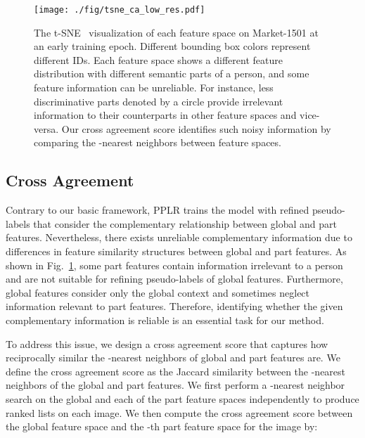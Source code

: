 \documentclass[10pt,twocolumn,letterpaper]{article}
\begin{document}
    \begin{figure}[t]
        \centering
        \texttt{[image: ./fig/tsne\_ca\_low\_res.pdf]}
        \caption{ 
            The t-SNE~\cite{van2008visualizing} visualization of each feature space on Market-1501 at an early training epoch.
            Different bounding box colors represent different IDs.
            Each feature space shows a different feature distribution with different semantic parts of a person, and some feature information can be unreliable.
            For instance, less discriminative parts denoted by a circle provide irrelevant information to their counterparts in other feature spaces and vice-versa.
            Our cross agreement score identifies such noisy information by comparing the -nearest neighbors between feature spaces.
        }
        \label{fig:tsne-each-space}
        \vspace{-5mm}
    \end{figure} 

\subsection{Cross Agreement} \label{ssec:3-2}
    Contrary to our basic framework, PPLR trains the model with refined pseudo-labels that consider the complementary relationship between global and part features.
    Nevertheless, there exists unreliable complementary information due to differences in feature similarity structures between global and part features.
    As shown in Fig.~\ref{fig:tsne-each-space}, some part features contain information irrelevant to a person and are not suitable for refining pseudo-labels of global features.
    Furthermore, global features consider only the global context and sometimes neglect information relevant to part features.
    Therefore, identifying whether the given complementary information is reliable is an essential task for our method.
    
    To address this issue, we design a cross agreement score that captures how reciprocally similar the -nearest neighbors of global and part features are.
    We define the cross agreement score as the Jaccard similarity between the -nearest neighbors of the global and part features.
    We first perform a -nearest neighbor search on the global and each of the part feature spaces independently to produce  ranked lists on each image.
    We then compute the cross agreement score between the global feature space  and the -th part feature space  for the image  by:
    
\end{document}
